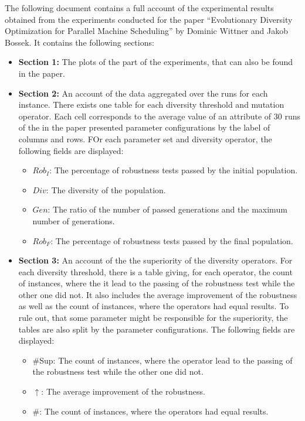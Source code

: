 \documentclass{article}
\begin{document}
                \begin{small}
                \noindent The following document contains a full account of the experimental results obtained from the experiments conducted for the paper \enquote{Evolutionary Diversity Optimization for Parallel Machine Scheduling} by Dominic Wittner and Jakob Bossek. 
                It contains the following sections:

                \begin{itemize}
                    \item \textbf{Section 1:} The plots of the part of the experiments, that can also be found in the paper.
                    \item \textbf{Section 2:} An account of the data aggregated over the runs for each instance. There exists one table for each diversity threshold and mutation operator. Each cell corresponds to the average value of an attribute of 30 runs of the in the paper presented parameter configurations by the label of columns and rows. FOr each parameter set and diversity operator, the following fields are displayed:
                    \begin{itemize}
                        \item $Rob_I$: The percentage of robustness tests passed by the initial population.
                        \item $Div$: The diversity of the population.
                        \item $Gen$: The ratio of the number of passed generations and the maximum number of generations.
                        \item $Rob_F$: The percentage of robustness tests passed by the final population.
                    \end{itemize}
                    \item \textbf{Section 3:} An account of the the superiority of the diversity operators. For each diversity threshold, there is a table giving, for each operator, the count of instances, where the it lead to the passing of the robustness test while the other one did not. It also includes the average improvement of the robustness as well as the count of instances, where the operators had equal results. To rule out, that some parameter might be responsible for the superiority, the tables are also split by the parameter configurations. The following fields are displayed:
                    \begin{itemize}
                        \item \#Sup: The count of instances, where the operator lead to the passing of the robustness test while the other one did not.
                        \item $\uparrow$: The average improvement of the robustness.
                        \item \#: The count of instances, where the operators had equal results.
                    \end{itemize}
                \end{itemize}
                \end{small}
                \tableofcontents
                \newpage
        \newpage
\end{document}
